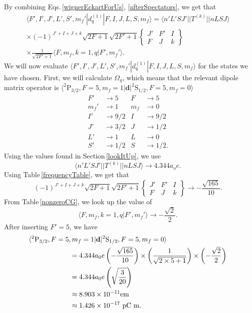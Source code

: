 By combining Eqs.\,\eqref{wignerEckartForUs}, \eqref{afterSpectators}, we get that  
\begin{multline}
\langle F',I',J',L',S',m_f'|d^{(1)}_q|F,I,J,L,S,m_f\rangle =\langle n'L' S J'||T^{(k)}|| n L S J\rangle\\
\times (-1)^{J'+I+J+k}\sqrt{2F+1}\sqrt{2F'+1}
\begin{Bmatrix}
J' & F' & I \\
F & J & k
\end{Bmatrix}\\
\times\frac{1}{\sqrt{2F'+1}}\langle F,m_f,k=1,q|F',m_f'\rangle.
\end{multline}
We will now evaluate $\langle F',I',J',L',S',m_f'|d^{(1)}_q|F,I,J,L,S,m_f\rangle$ for the states we have chosen. First, we will calculate $\Omega_g$, which means that the relevant dipole matrix operator is $\langle ^2\mathrm{P}_{3/2}, F=5, m_f=1|\mathbf{d}|^2\mathrm{S}_{1/2},F=5,m_f=0\rangle$ 
\begin{align}        
F'&\rightarrow5&      F&\rightarrow5\\
m_f'&\rightarrow1&    m_f&\rightarrow0\\
I'&\rightarrow9/2&    I&\rightarrow9/2\\
J'&\rightarrow3/2&    J&\rightarrow1/2\\
L'&\rightarrow1&      L&\rightarrow0\\
S'&\rightarrow1/2&    S&\rightarrow1/2.
\end{align}
Using the values found in Section\,\ref{lookItUp}, we use 
\begin{equation}
\langle n'L' S J'||T^{(k)}|| n L S J\rangle \rightarrow 4.344 a_oe.
\end{equation}
Using Table\,\ref{frequencyTable}, we get that 
\begin{equation}
(-1)^{J'+I+J+k}\sqrt{2F+1}\sqrt{2F'+1}
\begin{Bmatrix}
J' & F' & I \\
F & J & k
\end{Bmatrix}\rightarrow
-\frac{\sqrt{165}}{10}.
\end{equation}
From Table\,\ref{nonzeroCG}, we look up the value of 
\begin{equation}
\langle F,m_f,k=1,q|F',m_f'\rangle\rightarrow-\frac{\sqrt{2}}{2}.
\end{equation}
After inserting $F'=5$, we have 
\begin{align}
\hspace{6em}&\hspace{-6em}\langle ^2\mathrm{P}_{3/2}, F=5, m_f=1|\mathbf{d}|^2\mathrm{S}_{1/2},F=5,m_f=0\rangle\\
&=4.344a_0e\left(-\frac{\sqrt{165}}{10}\right)\times\left(\frac{1}{\sqrt{2\times5+1}}\right)\times\left(-\frac{\sqrt{2}}{2}\right) \\
&=4.344a_0e\left(\sqrt{\frac{3}{20}}\right)\\
&\approx 8.903\times10^{-11} \mathrm{e} \mathrm{m}\\
&\approx 1.426\times10^{-17} \textnormal{ pC} \textnormal{ m}.
\end{align}

